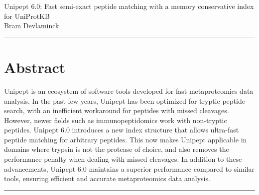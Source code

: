 \documentclass[11pt]{article}
\begin{document}
    \begingroup
    \centering
    \LARGE Unipept 6.0: Fast semi-exact peptide matching with a memory conservative index for UniProtKB\\[1em]
    \large Bram Devlaminck\\[2em]
    \endgroup

    \par\noindent\rule{\linewidth}{.5pt}
    \section*{Abstract}\label{sec:test-section}
    Unipept is an ecosystem of software tools developed for fast metaproteomics data analysis.
    In the past few years, Unipept has been optimized for tryptic peptide search, with an inefficient workaround for peptides with missed cleavages.
    However, newer fields such as immunopeptidomics work with non-tryptic peptides.
    Unipept 6.0 introduces a new index structure that allows ultra-fast peptide matching for arbitrary peptides.
    This now makes Unipept applicable in domains where trypsin is not the protease of choice, and also removes the performance penalty when dealing with missed cleavages.
    In addition to these advancements, Unipept 6.0 maintains a superior performance compared to similar tools, ensuring efficient and accurate metaproteomics data analysis.
    \par\noindent\rule{\linewidth}{.5pt} %
\end{document}
